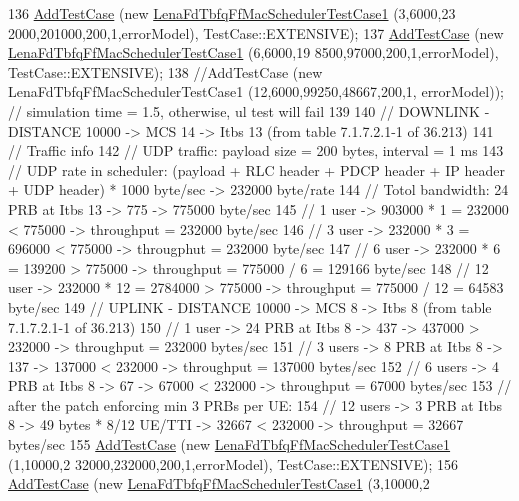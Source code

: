 \begin{DoxyCode}
136   \hyperlink{classns3_1_1TestCase_a3718088e3eefd5d6454569d2e0ddd835}{AddTestCase} (\textcolor{keyword}{new} \hyperlink{classLenaFdTbfqFfMacSchedulerTestCase1}{LenaFdTbfqFfMacSchedulerTestCase1} (3,6000,23
      2000,201000,200,1,errorModel), TestCase::EXTENSIVE);
137   \hyperlink{classns3_1_1TestCase_a3718088e3eefd5d6454569d2e0ddd835}{AddTestCase} (\textcolor{keyword}{new} \hyperlink{classLenaFdTbfqFfMacSchedulerTestCase1}{LenaFdTbfqFfMacSchedulerTestCase1} (6,6000,19
      8500,97000,200,1,errorModel), TestCase::EXTENSIVE);
138   \textcolor{comment}{//AddTestCase (new LenaFdTbfqFfMacSchedulerTestCase1 (12,6000,99250,48667,200,1, errorModel)); //
       simulation time = 1.5, otherwise, ul test will fail}
139 
140   \textcolor{comment}{// DOWNLINK - DISTANCE 10000 -> MCS 14 -> Itbs 13 (from table 7.1.7.2.1-1 of 36.213)}
141   \textcolor{comment}{// Traffic info}
142   \textcolor{comment}{//   UDP traffic: payload size = 200 bytes, interval = 1 ms}
143   \textcolor{comment}{//   UDP rate in scheduler: (payload + RLC header + PDCP header + IP header + UDP header) * 1000 byte/sec
       -> 232000 byte/rate }
144   \textcolor{comment}{// Totol bandwidth: 24 PRB at Itbs 13 -> 775 -> 775000 byte/sec}
145   \textcolor{comment}{// 1 user -> 903000 * 1 = 232000 < 775000 -> throughput = 232000 byte/sec}
146   \textcolor{comment}{// 3 user -> 232000 * 3 = 696000 < 775000 -> througphut = 232000 byte/sec}
147   \textcolor{comment}{// 6 user -> 232000 * 6 = 139200 > 775000 -> throughput = 775000 / 6 = 129166 byte/sec}
148   \textcolor{comment}{// 12 user -> 232000 * 12 = 2784000 > 775000 -> throughput =  775000 / 12 = 64583 byte/sec}
149   \textcolor{comment}{// UPLINK - DISTANCE 10000 -> MCS 8 -> Itbs 8 (from table 7.1.7.2.1-1 of 36.213)}
150   \textcolor{comment}{// 1 user -> 24 PRB at Itbs 8 -> 437 -> 437000 > 232000 -> throughput = 232000 bytes/sec}
151   \textcolor{comment}{// 3 users -> 8 PRB at Itbs 8 -> 137 -> 137000 < 232000 -> throughput = 137000 bytes/sec}
152   \textcolor{comment}{// 6 users -> 4 PRB at Itbs 8 -> 67 -> 67000 < 232000 -> throughput = 67000 bytes/sec}
153   \textcolor{comment}{// after the patch enforcing min 3 PRBs per UE:}
154   \textcolor{comment}{// 12 users -> 3 PRB at Itbs 8 -> 49 bytes * 8/12 UE/TTI -> 32667 < 232000 -> throughput = 32667 
       bytes/sec}
155   \hyperlink{classns3_1_1TestCase_a3718088e3eefd5d6454569d2e0ddd835}{AddTestCase} (\textcolor{keyword}{new} \hyperlink{classLenaFdTbfqFfMacSchedulerTestCase1}{LenaFdTbfqFfMacSchedulerTestCase1} (1,10000,2
      32000,232000,200,1,errorModel), TestCase::EXTENSIVE);
156   \hyperlink{classns3_1_1TestCase_a3718088e3eefd5d6454569d2e0ddd835}{AddTestCase} (\textcolor{keyword}{new} \hyperlink{classLenaFdTbfqFfMacSchedulerTestCase1}{LenaFdTbfqFfMacSchedulerTestCase1} (3,10000,2

\end{DoxyCode}
